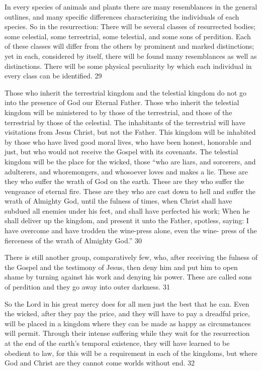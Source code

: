 In every species of animals and plants there are many resemblances in the general outlines,
and many specific differences characterizing the individuals of each species. So in the
resurrection: There will be several classes of resurrected bodies; some celestial, some
terrestrial, some telestial, and some sons of perdition. Each of these classes will differ from
the others by prominent and marked distinctions; yet in each, considered by itself, there will
be found many resemblances as well as distinctions. There will be some physical peculiarity
by which each individual in every class can be identified. 29

Those who inherit the terrestrial kingdom and the telestial kingdom do not go into the
presence of God our Eternal Father. Those who inherit the telestial kingdom will be
ministered to by those of the terrestrial, and those of the terrestrial by those of the celestial.
The inhabitants of the terrestrial will have visitations from Jesus Christ, but not the Father.
This kingdom will be inhabited by those who have lived good moral lives, who have been
honest, honorable and just, but who would not receive the Gospel with its covenants. The
telestial kingdom will be the place for the wicked, those ``who are liars, and sorcerers, and
adulterers, and whoremongers, and whosoever loves and makes a lie. These are they who
suffer the wrath of God on the earth. These are they who suffer the vengeance of eternal fire.
These are they who are cast down to hell and suffer the wrath of Almighty God, until the
fulness of times, when Christ shall have subdued all enemies under his feet, and shall have
perfected his work; When he shall deliver up the kingdom, and present it unto the Father,
spotless, saying: I have overcome and have trodden the wine-press alone, even the wine-
press of the fierceness of the wrath of Almighty God.'' 30

There is still another group, comparatively few, who, after receiving the fulness of the
Gospel and the testimony of Jesus, then deny him and put him to open shame by turning
against his work and denying his power. These are called sons of perdition and they go away
into outer darkness. 31

So the Lord in his great mercy does for all men just the best that he can. Even the wicked,
after they pay the price, and they will have to pay a dreadful price, will be placed in a
kingdom where they can be made as happy as circumstances will permit. Through their
intense suffering while they wait for the resurrection at the end of the earth's temporal
existence, they will have learned to be obedient to law, for this will be a requirement in each
of the kingdoms, but where God and Christ are they cannot come worlds without end. 32

